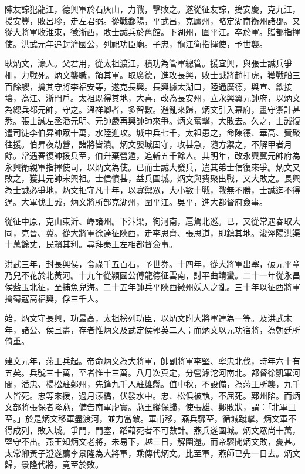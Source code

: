 \begin{pinyinscope}
陳友諒犯龍江，德興軍於石灰山，力戰，擊敗之。遂從征友諒，搗安慶，克九江，援安豐，敗呂珍，走左君弼。從戰鄱陽，平武昌，克廬州，略定湖南衡州諸郡。又從大將軍收淮東，徵浙西，敗士誠兵於舊館。下湖州，圍平江。卒於軍。贈都指揮使。洪武元年追封濟國公，列祀功臣廟。子忠，龍江衛指揮使，予世襲。

耿炳文，濠人。父君用，從太祖渡江，積功為管軍總管。援宜興，與張士誠兵爭柵，力戰死。炳文襲職，領其軍。取廣德，進攻長興，敗士誠將趙打虎，獲戰船三百餘艘，擒其守將李福安等，遂克長興。長興據太湖口，陸通廣德，與宣、歙接壤，為江、浙門戶。太祖既得其地，大喜，改為長安州，立永興翼元帥府，以炳文為總兵都元帥，守之。溫祥卿者，多智數。避亂來歸，炳文引入幕府，畫守禦計甚悉。張士誠左丞潘元明、元帥嚴再興帥師來爭。炳文奮擊，大敗去。久之，士誠復遣司徒李伯昇帥眾十萬，水陸進攻。城中兵七千，太祖患之，命陳德、華高、費聚往援。伯昇夜劫營，諸將皆潰。炳文嬰城固守，攻甚急，隨方禦之，不解甲者月餘。常遇春復帥援兵至，伯升棄營遁，追斬五千餘人。其明年，改永興翼元帥府為永興衛親軍指揮使司，以炳文為使。已而士誠大發兵，遣其弟士信復來爭。炳文又敗之，獲其元帥宋興祖。士信憤甚，益兵圍城。炳文與費聚出戰，又大敗之。長興為士誠必爭地，炳文拒守凡十年，以寡禦眾，大小數十戰，戰無不勝，士誠迄不得逞。大軍伐士誠，炳文將所部克湖州，圍平江。吳平，進大都督府僉事。

從征中原，克山東沂、嶧諸州。下汴梁，徇河南，扈駕北巡。已，又從常遇春取大同，克晉、冀。從大將軍徐達征陜西，走李思齊、張思道，即鎮其地。浚涇陽洪渠十萬餘丈，民賴其利。尋拜秦王左相都督僉事。

洪武三年，封長興侯，食祿千五百石，予世券。十四年，從大將軍出塞，破元平章乃兒不花於北黃河。十九年從潁國公傅龍德征雲南，討平曲靖蠻。二十一年從永昌侯藍玉北征，至捕魚兒海。二十五年帥兵平陜西徽州妖人之亂。三十年以征西將軍擒蜀寇高福興，俘三千人。

始，炳文守長興，功最高，太祖榜列功臣，以炳文附大將軍達為一等。及洪武末年，諸公、侯且盡，存者惟炳文及武定侯郭英二人；而炳文以元功宿將，為朝廷所倚重。

建文元年，燕王兵起。帝命炳文為大將軍，帥副將軍李堅、寧忠北伐，時年六十有五矣。兵號三十萬，至者惟十三萬。八月次真定，分營滹沱河南北。都督徐凱軍河間，潘忠、楊松駐鄚州，先鋒九千人駐雄縣。值中秋，不設備，為燕王所襲，九千人皆死。忠等來援，過月漾橋，伏發水中。忠、松俱被執，不屈死。鄚州陷。而炳文部將張保者降燕，備告南軍虛實。燕王縱保歸，使張雄、鄚敗狀，謂：「北軍且至。」於是炳文移軍盡渡河，並力當敵。軍甫移，燕兵驟至，循城蹴擊。炳文軍不得成列，敗入城。爭門，門塞，蹈藉死者不可數計。燕兵遂圍城。炳文眾尚十萬，堅守不出。燕王知炳文老將，未易下，越三日，解圍還。而帝驟聞炳文敗，憂甚。太常卿黃子澄遂薦李景隆為大將軍，乘傳代炳文。比至軍，燕師已先一日去。炳文歸，景隆代將，竟至於敗。


\end{pinyinscope}
